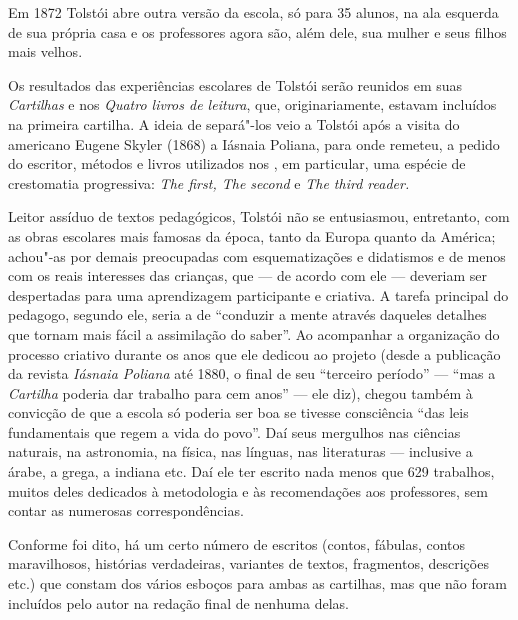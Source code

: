 Em 1872 Tolstói abre outra versão da escola, só para 35 alunos, na ala esquerda de
sua própria casa e os professores agora são, além dele, sua mulher e
seus filhos mais velhos.

Os resultados das experiências escolares de Tolstói serão reunidos em
suas \emph{Cartilhas} e nos \emph{Quatro livros de leitura}, que,
originariamente, estavam incluídos na primeira cartilha. A ideia de
separá"-los veio a Tolstói após a visita do americano Eugene Skyler
(1868) a Iásnaia Poliana, para onde remeteu, a pedido do escritor,
métodos e livros utilizados nos , em particular, uma espécie de
crestomatia progressiva: \emph{The first, The second} e \emph{The third
reader.}

Leitor assíduo de textos pedagógicos, Tolstói não se entusiasmou,
entretanto, com as obras escolares mais famosas da época, tanto da
Europa quanto da América; achou"-as por demais preocupadas com
esquematizações e didatismos e de menos com os reais interesses das
crianças, que --- de acordo com ele --- deveriam ser despertadas para uma
aprendizagem participante e criativa. A tarefa principal do pedagogo,
segundo ele, seria a de ``conduzir a mente através daqueles detalhes que
tornam mais fácil a assimilação do saber''. Ao acompanhar a organização
do processo criativo durante os anos que ele dedicou ao projeto (desde a
publicação da revista \emph{Iásnaia Poliana} até 1880, o final de seu
``terceiro período'' --- ``mas a \emph{Cartilha} poderia dar trabalho para
cem anos'' --- ele diz), chegou também à convicção de que a escola só
poderia ser boa se tivesse consciência ``das leis fundamentais que regem
a vida do povo''. Daí seus mergulhos nas ciências naturais, na
astronomia, na física, nas línguas, nas literaturas --- inclusive a árabe,
a grega, a indiana etc. Daí ele ter escrito nada menos que 629
trabalhos, muitos deles dedicados à metodologia e às recomendações aos
professores, sem contar as numerosas correspondências. 

Conforme foi dito, há um certo número de escritos (contos, fábulas,
contos maravilhosos, histórias verdadeiras, variantes de textos,
fragmentos, descrições etc.) que constam dos vários esboços para ambas
as cartilhas, mas que não foram incluídos pelo autor na redação final de
nenhuma delas.

